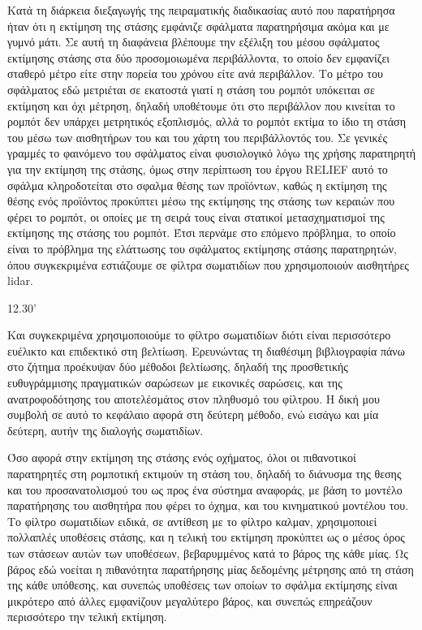 \documentclass[a4paper,10pt]{article}
\begin{document}
Κατά τη διάρκεια διεξαγωγής της πειραματικής διαδικασίας αυτό που παρατήρησα
ήταν ότι η εκτίμηση της στάσης εμφάνιζε σφάλματα παρατηρήσιμα ακόμα και με
γυμνό μάτι. Σε αυτή τη διαφάνεια βλέπουμε την εξέλιξη του μέσου σφάλματος
εκτίμησης στάσης στα δύο προσομοιωμένα περιβάλλοντα, το οποίο δεν εμφανίζει
σταθερό μέτρο είτε στην πορεία του χρόνου είτε ανά περιβάλλον.  Το μέτρο του
σφάλματος εδώ μετριέται σε εκατοστά γιατί η στάση του ρομπότ υπόκειται σε
εκτίμηση και όχι μέτρηση, δηλαδή υποθέτουμε ότι στο περιβάλλον που κινείται το
ρομπότ δεν υπάρχει μετρητικός εξοπλισμός, αλλά το ρομπότ εκτίμα το ίδιο τη
στάση του μέσω των αισθητήρων του και του χάρτη του περιβάλλοντός του. Σε
γενικές γραμμές το φαινόμενο του σφάλματος είναι φυσιολογικό λόγω της χρήσης
παρατηρητή για την εκτίμηση της στάσης, όμως στην περίπτωση του έργου RELIEF
αυτό το σφάλμα κληροδοτείται στο σφαλμα θέσης των προϊόντων, καθώς η εκτίμηση
της θέσης ενός προϊόντος προκύπτει μέσω της εκτίμησης της στάσης των κεραιών
που φέρει το ρομπότ, οι οποίες με τη σειρά τους είναι στατικοί μετασχηματισμοί
της εκτίμησης της στάσης του ρομπότ.  Έτσι περνάμε στο επόμενο πρόβλημα, το
οποίο είναι το πρόβλημα της ελάττωσης του σφάλματος εκτίμησης στάσης
παρατηρητών, όπου συγκεκριμένα εστιάζουμε σε φίλτρα σωματιδίων που
χρησιμοποιούν αισθητήρες lidar.

12.30'



Και συγκεκριμένα χρησιμοποιούμε το φίλτρο σωματιδίων διότι είναι περισσότερο
ευέλικτο και επιδεκτικό στη βελτίωση. Ερευνώντας τη διαθέσιμη βιβλιογραφία πάνω
στο ζήτημα προέκυψαν δύο μέθοδοι βελτίωσης, δηλαδή της προσθετικής
ευθυγράμμισης πραγματικών σαρώσεων με εικονικές σαρώσεις, και της
ανατροφοδότησης του αποτελέσμάτος στον πληθυσμό του φίλτρου. Η δική μου συμβολή
σε αυτό το κεφάλαιο αφορά στη δεύτερη μέθοδο, ενώ εισάγω και μία δεύτερη, αυτήν
της διαλογής σωματιδίων.

Όσο αφορά στην εκτίμηση της στάσης ενός οχήματος, όλοι οι πιθανοτικοί
παρατηρητές στη ρομποτική εκτιμούν τη στάση του, δηλαδή το διάνυσμα της
θεσης και του προσανατολισμού του ως προς ένα σύστημα αναφοράς,
με βάση το μοντέλο παρατήρησης του αισθητήρα που φέρει το όχημα, και του
κινηματικού μοντέλου του. Το φίλτρο σωματιδίων ειδικά, σε αντίθεση με το φίλτρο
καλμαν, χρησιμοποιεί πολλαπλές υποθέσεις στάσης, και η τελική του εκτίμηση
προκύπτει ως ο μέσος όρος των στάσεων αυτών των υποθέσεων, βεβαρυμμένος
κατά το βάρος της κάθε μίας. Ως βάρος εδώ νοείται η πιθανότητα παρατήρησης
μίας δεδομένης μέτρησης από τη στάση της κάθε υπόθεσης, και συνεπώς υποθέσεις
των οποίων το σφάλμα εκτίμησης είναι μικρότερο από άλλες εμφανίζουν μεγαλύτερο
βάρος, και συνεπώς επηρεάζουν περισσότερο την τελική εκτίμηση.
\end{document}
